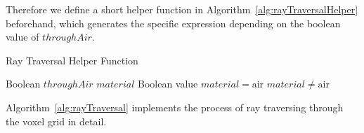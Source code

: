 Therefore we define a short helper function in
Algorithm~\ref{alg:rayTraversalHelper} beforehand, which generates the specific
expression depending on the boolean value of $throughAir$.

\begin{algorithm}[H]
\caption{Ray Traversal Helper Function}
\label{alg:rayTraversalHelper}
\begin{algorithmic}[1]
\Require Boolean $throughAir$
\Require $material$
\Ensure Boolean value
    \State \Return $material = \text{air}$
\Else
    \State \Return $material \neq \text{air}$
\EndIf
\end{algorithmic}
\end{algorithm}

Algorithm~\ref{alg:rayTraversal} implements the process of ray traversing
through the voxel grid in detail.

